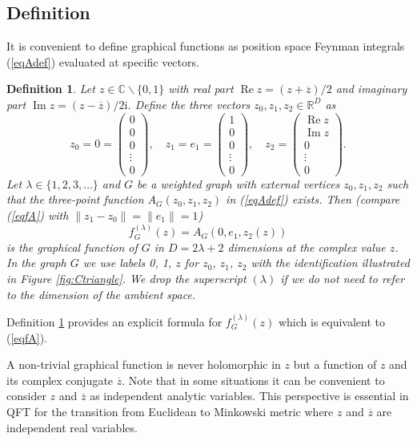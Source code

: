 \documentclass[oneside]{amsart}
\newcommand{\CC}{{\mathbb C}}
\newcommand{\RR}{{\mathbb R}}
\newcommand{\ii}{\mathrm{i}}
\newcommand{\zz}{{\overline{z}}}
\renewcommand{\Im}{\mathop\mathrm{Im}}
\renewcommand{\Re}{\mathop\mathrm{Re}}
\theoremstyle{plain}
\newtheorem{defn}[thm]{Definition}
\begin{document}
\subsection{Definition}\label{sectgfdef}
It is convenient to define graphical functions as position space Feynman integrals (\ref{eqAdef}) evaluated at specific vectors.
\begin{defn}\label{defgf}
Let $z\in\CC\backslash\{0,1\}$ with real part $\Re z=(z+\zz)/2$ and imaginary part $\Im z=(z-\zz)/2\ii$. Define the three vectors $z_0,z_1,z_2\in\RR^D$ as
\begin{equation}\label{eqzdef}
z_0=0=\left(\begin{array}{c}0\\0\\0\\ \vdots\\0\end{array}\right),\quad
z_1=e_1=\left(\begin{array}{c}1\\0\\0\\\vdots\\0\end{array}\right),\quad
z_2=\left(\begin{array}{c}\Re z\\\Im z\\0\\\vdots\\0\end{array}\right).
\end{equation}
Let $\lambda\in\{1,2,3,\ldots\}$ and $G$ be a weighted graph with external vertices $z_0,z_1,z_2$ such that the three-point function $A_G(z_0,z_1,z_2)$ in (\ref{eqAdef}) exists. Then
(compare (\ref{eqfA}) with $\|z_1-z_0\|=\|e_1\|=1$)
\begin{equation}\label{eqfGdef}
f_G^{(\lambda)}(z)=A_G(0,e_1,z_2(z))
\end{equation}
is the graphical function of $G$ in $D=2\lambda+2$ dimensions at the complex value $z$. In the graph $G$ we use labels 0, 1, $z$ for $z_0$, $z_1$, $z_2$ with the identification illustrated
in Figure \ref{fig:Ctriangle}. We drop the superscript $(\lambda)$ if we do not need to refer to the dimension of the ambient space.
\end{defn}
Definition \ref{defgf} provides an explicit formula for $f_G^{(\lambda)}(z)$ which is equivalent to (\ref{eqfA}).

A non-trivial graphical function is never holomorphic in $z$ but a function of $z$ and its complex conjugate $\zz$. Note that in some situations it can be convenient to consider $z$
and $\zz$ as independent analytic variables. This perspective is essential in QFT for the transition from Euclidean to Minkowski metric where $z$ and $\zz$ are independent real variables.
\end{document}
